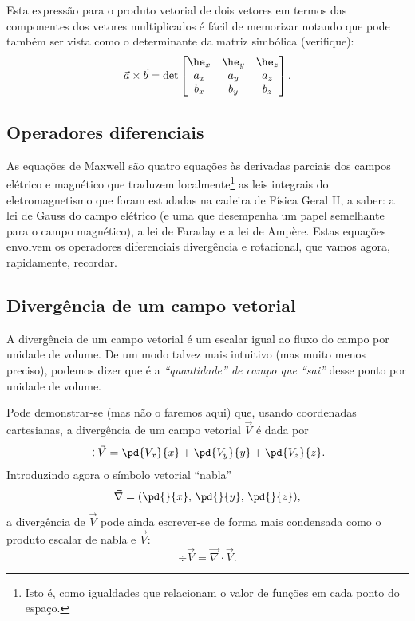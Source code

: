 Esta expressão para o produto vetorial de dois vetores em termos das componentes
dos vetores multiplicados é fácil de memorizar notando que pode também ser vista
como o determinante da matriz simbólica (verifique):
\begin{equation}
  \vec a\times\vec b =\det
  \begin{bmatrix}
    \he_x&\he_y&\he_z\\
    a_x&a_y&a_z\\
    b_x&b_y&b_z
  \end{bmatrix}.
\end{equation}

\subsection{Operadores diferenciais}
As equações de Maxwell são quatro equações às derivadas parciais dos campos
elétrico e magnético que traduzem localmente\footnote{Isto é, como igualdades
que relacionam o valor de funções em cada ponto do espaço.} as leis integrais
do eletromagnetismo que foram estudadas na cadeira de Física Geral II, a saber:
a lei de Gauss do campo elétrico (e uma que desempenha um papel semelhante para
o campo magnético), a lei de Faraday e a lei de Ampère. Estas equações envolvem
os operadores diferenciais divergência e rotacional, que vamos agora,
rapidamente, recordar.

\subsection*{Divergência de um campo vetorial}
A divergência de um campo vetorial é um escalar igual ao fluxo do campo por
unidade de volume.  De um modo talvez mais intuitivo (mas muito menos preciso),
podemos dizer que é a \emph{``quantidade'' de campo que ``sai''} desse ponto por
unidade de volume.  

Pode demonstrar-se (mas não o faremos aqui) que, usando
coordenadas cartesianas, a divergência de um campo vetorial $\vec V$ é dada por
\begin{equation}\label{eq:divcart}
  \div\vec V=\pd{V_x}{x} + \pd{V_y}{y}+\pd{V_z}{z}.
\end{equation}
Introduzindo agora o símbolo vetorial ``nabla'' 
\begin{equation*}
  \vec \nabla = (\pd{}{x},\, \pd{}{y},\, \pd{}{z}),
\end{equation*}
a divergência de $\vec V$ pode ainda escrever-se de forma mais condensada como
o produto escalar de nabla e $\vec V$:
\begin{equation}
  \div\vec V=\vec\nabla\cdot\vec V.
\end{equation}


